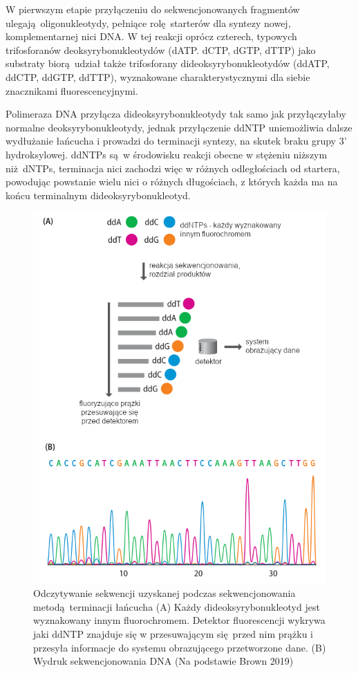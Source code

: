 \documentclass[two column, twoside, a4paper]{article}
\begin{document}
W pierwszym etapie przyłączeniu do sekwencjonowanych fragmentów ulegają oligonukleotydy, pełniące rolę starterów dla syntezy nowej, komplementarnej nici DNA. W tej reakcji oprócz czterech, typowych trifosforanów deoksyrybonukleotydów (dATP. dCTP, dGTP, dTTP) jako substraty biorą udział także trifosforany dideoksyrybonukleotydów (ddATP, ddCTP, ddGTP, ddTTP), wyznakowane charakterystycznymi dla siebie znacznikami fluorescencyjnymi.

Polimeraza DNA przyłącza dideoksyrybonukleotydy tak samo jak przyłączyłaby normalne deoksyrybonukleotydy, jednak przyłączenie ddNTP uniemożliwia dalsze wydłużanie łańcucha i prowadzi do terminacji syntezy, na skutek braku grupy 3' hydroksylowej. ddNTPs są w środowisku reakcji obecne w stężeniu niższym niż dNTPs, terminacja nici zachodzi więc w różnych odległościach od startera, powodując powstanie wielu nici o różnych długościach, z których każda ma na końcu terminalnym dideoksyrybonukleotyd.

\begin{figure}[h]
\begin{tcolorbox}
	\centering
	\includegraphics[width=\textwidth]{./figury/sekwencja_metoda_terminacji.png}
	\caption{Odczytywanie sekwencji uzyskanej podczas sekwencjonowania metodą terminacji łańcucha (A) Każdy dideoksyrybonukleotyd jest wyznakowany innym fluorochromem. Detektor fluorescencji wykrywa jaki ddNTP znajduje się w przesuwającym się przed nim prążku i przesyła informacje do systemu obrazującego przetworzone dane. (B) Wydruk sekwencjonowania DNA (Na podstawie Brown 2019)}\label{fig::seq_chain_term}
\end{tcolorbox}
\end{figure}
\end{document}
